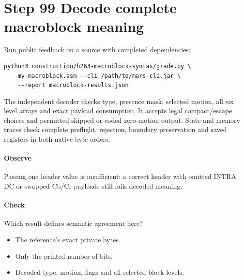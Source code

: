 \section{Step 99 Decode complete macroblock meaning}\label{h263-syntax-s09}
Run public feedback on a source with completed dependencies:
\begin{verbatim}
python3 construction/h263-macroblock-syntax/grade.py \
    my-macroblock.asm --cli /path/to/mars-cli.jar \
    --report macroblock-results.json
\end{verbatim}
The independent decoder checks type, presence mask, selected motion, all six
level arrays and exact payload consumption. It accepts legal compact/escape
choices and permitted skipped or coded zero-motion output. State and memory traces
check complete preflight, rejection, boundary preservation and saved registers
in both native byte orders.

\paragraph{Observe} Passing one header value is insufficient: a correct header
with omitted INTRA DC or swapped Cb/Cr payloads still fails decoded meaning.
\Needspace{8\baselineskip}
\paragraph{Check} Which result defines semantic agreement here?
\begin{itemize}
  \item[A.] The reference's exact private bytes.
  \item[B.] Only the printed number of bits.
  \item[C.] Decoded type, motion, flags and all selected block levels.
\end{itemize}
